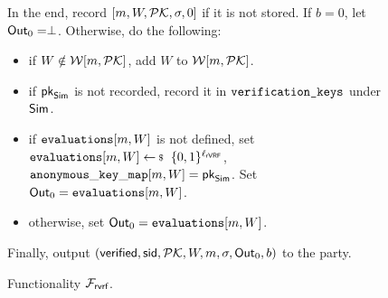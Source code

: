 \begin{figure}
\begin{tcolorbox}
{\begin{description}
\begin{list}{\hspace*{1pt} C}{}
				
			\end{list}
			In the end,  record $ [m,W,{\mathcal{PK}},\sigma, 0] $ if it is not stored. If $ b = 0 $, let $ {\mathsf{Out}}_0 = \perp $. Otherwise,   do the following:
			\begin{itemize}
				\item if $ W \notin \mathcal{W}[m,{\mathcal{PK}}] $, add $ W $ to $ \mathcal{W}[m,{\mathcal{PK}}]  $.
				\item if $ \mathsf{pk}_{\mathsf{Sim}} $ is not recorded, record it in $ \texttt{verification\_keys} $ under $ \mathsf{Sim} $.
				\item if $ \texttt{evaluations}[m,W] $ is not defined, set $ \evaluationslist[m, W]\leftsample \bin^{\ell_\rVRF}$, $ \mathtt{anonymous\_key\_map}[m,W]  = \mathsf{pk}_{\mathsf{Sim}}$.  Set $ {\mathsf{Out}}_0 = \texttt{evaluations}[m, W]$.
				\item otherwise, set $ {\mathsf{Out}}_0 = \texttt{evaluations}[m, W]$. 	
			\end{itemize}
			Finally, output $(\mathsf{verified}, \textsf{sid}, {\mathcal{PK}},W, m, \sigma, {\mathsf{Out}}_0, b)$ to the party.
			
		\end{description}
		
		
	}
\end{tcolorbox}
\caption{Functionality $\mathcal{F}_{\textsf{rvrf}}$.\label{f:gvrf}}
\end{figure}



